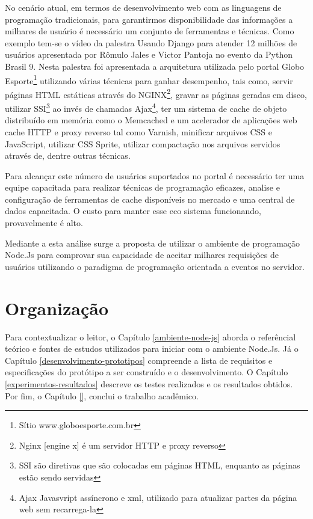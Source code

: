   No cenário atual, em termos de desenvolvimento web com as linguagens de programação tradicionais, 
  para garantirmos disponibilidade das informações a milhares de usuário é necessário um conjunto 
  de ferramentas e técnicas. Como exemplo tem-se o vídeo da palestra Usando Django para atender 12 milhões de usuários 
  apresentada por Rômulo Jales e Victor Pantoja no evento da Python Brasil 9.
  Nesta palestra foi apresentada a arquitetura utilizada pelo portal 
  Globo Esporte\footnote{Sítio www.globoesporte.com.br} utilizando várias técnicas 
  para ganhar desempenho, tais como, servir páginas HTML estáticas através do 
  NGINX\footnote{Nginx [engine x] é um servidor HTTP e proxy reverso}, gravar as páginas geradas em 
  disco, utilizar 
  SSI\footnote{SSI são diretivas que são colocadas em páginas HTML, enquanto as páginas estão sendo servidas} 
  ao invés de chamadas 
  Ajax\footnote{Ajax Javasvript assíncrono e xml, utilizado para atualizar partes da página web sem recarrega-la}, 
  ter um sistema de cache de objeto distribuído em memória   como o Memcached e um acelerador de aplicações web
  cache HTTP e proxy reverso tal como Varnish, minificar  arquivos CSS e JavaScript, utilizar CSS Sprite, utilizar 
  compactação nos arquivos servidos através de, dentre outras técnicas.
  
  Para alcançar este número de usuários suportados no portal é necessário ter uma equipe 
  capacitada para realizar técnicas de programação eficazes, analise e configuração de ferramentas de cache 
  disponíveis no mercado e uma central de dados capacitada. O custo para manter esse eco sistema funcionando,
  provavelmente é alto.
  
  Mediante a esta análise surge a proposta de utilizar o ambiente de programação Node.Js para comprovar sua 
  capacidade de aceitar milhares requisições de usuários utilizando o paradigma de programação orientada a eventos 
  no servidor.
  
\section{Organização}
\label{organizacao}  

  Para contextualizar o leitor, o Capítulo \ref{ambiente-node-js} aborda o referêncial teórico e fontes de estudos utilizados para iniciar com o ambiente 
  Node.Js. Já o Capítulo \ref{desenvolvimento-prototipos} compreende a lista de requisitos e especificações do protótipo a ser construído e o
  desenvolvimento. O Capítulo \ref{experimentos-resultados} descreve os testes realizados e os resultados obtidos. 
  Por fim, o Capítulo \ref{}, conclui o trabalho acadêmico.